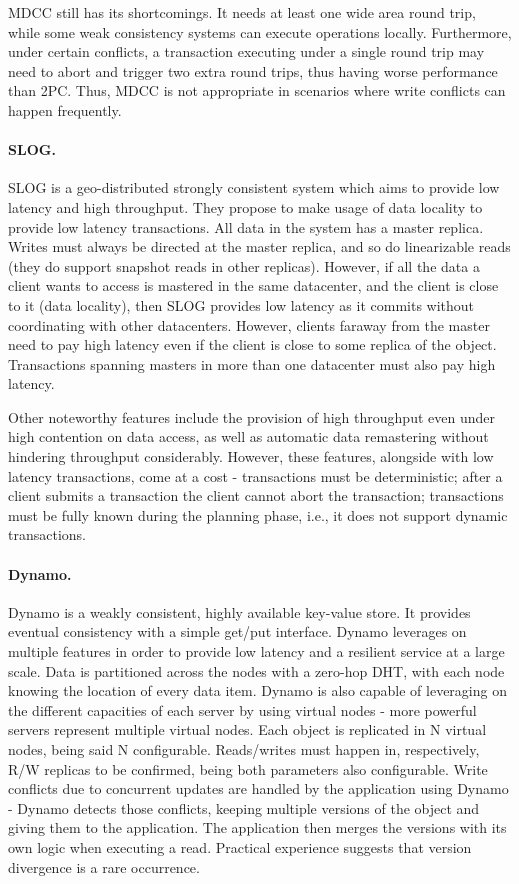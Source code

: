 MDCC still has its shortcomings.
It needs at least one wide area round trip, while some weak consistency systems can execute operations locally.
Furthermore, under certain conflicts, a transaction executing under a single round trip may need to abort and trigger two extra round trips, thus having worse performance than 2PC.
Thus, MDCC is not appropriate in scenarios where write conflicts can happen frequently.

\paragraph{SLOG.} SLOG \cite{slog} is a geo-distributed strongly consistent system which aims to provide low latency and high throughput.
They propose to make usage of data locality to provide low latency transactions.
All data in the system has a master replica.
Writes must always be directed at the master replica, and so do linearizable reads (they do support snapshot reads in other replicas).
However, if all the data a client wants to access is mastered in the same datacenter, and the client is close to it (data locality), then SLOG provides low latency as it commits without coordinating with other datacenters.
However, clients faraway from the master need to pay high latency even if the client is close to some replica of the object.
Transactions spanning masters in more than one datacenter must also pay high latency.

Other noteworthy features include the provision of high throughput even under high contention on data access, as well as automatic data remastering without hindering throughput considerably.
However, these features, alongside with low latency transactions, come at a cost - transactions must be deterministic; after a client submits a transaction the client cannot abort the transaction; transactions must be fully known during the planning phase, i.e., it does not support dynamic transactions.

\paragraph{Dynamo.} Dynamo \cite{dynamo} is a weakly consistent, highly available key-value store.
It provides eventual consistency with a simple get/put interface.
Dynamo leverages on multiple features in order to provide low latency and a resilient service at a large scale.
Data is partitioned across the nodes with a zero-hop DHT, with each node knowing the location of every data item.
Dynamo is also capable of leveraging on the different capacities of each server by using virtual nodes - more powerful servers represent multiple virtual nodes.
Each object is replicated in N virtual nodes, being said N configurable. Reads/writes must happen in, respectively, R/W replicas to be confirmed, being both parameters also configurable.
Write conflicts due to concurrent updates are handled by the application using Dynamo - Dynamo detects those conflicts, keeping multiple versions of the object and giving them to the application.
The application then merges the versions with its own logic when executing a read.
Practical experience suggests that version divergence is a rare occurrence.

